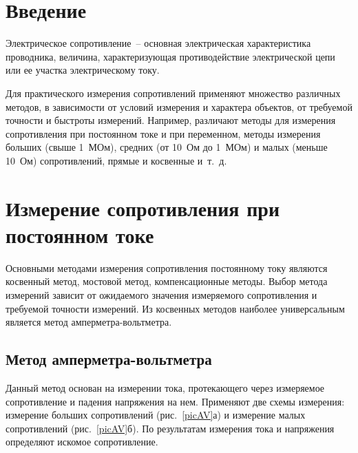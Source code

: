 \documentclass[pscyr]{hedwork}
\newcommand{\Pic}[1]{\ref{pic#1}}
\newcommand{\pic}[1]{рис.~\Pic{#1}}
\begin{document}
  \maketitle
  \tableofcontents

  \section*{Введение}
  
  Электрическое сопротивление~-- основная электрическая характеристика
  проводника, величина, характеризующая противодействие электрической цепи или
  ее участка электрическому току.

  Для практического измерения сопротивлений применяют множество различных
  методов, в зависимости от условий измерения и характера объектов, от требуемой
  точности и быстроты измерений. Например, различают методы для измерения
  сопротивления при постоянном токе и при переменном, методы измерения
  больших (свыше 1~МОм), средних (от 10~Ом до 1~МОм) и малых (меньше 10~Ом)
  сопротивлений, прямые и косвенные и~т.~д.

  \section{Измерение сопротивления при постоянном токе}

  Основными методами измерения сопротивления постоянному току являются косвенный
  метод, мостовой метод, компенсационные методы. Выбор метода измерений зависит
  от ожидаемого значения измеряемого сопротивления и требуемой точности
  измерений. Из косвенных методов наиболее универсальным является метод
  амперметра-вольтметра.

  \subsection{Метод амперметра-вольтметра}

  Данный метод основан на измерении тока, протекающего через измеряемое
  сопротивление и падения напряжения на нем. Применяют две схемы измерения:
  измерение больших сопротивлений (\pic{AV}а) и измерение малых сопротивлений
  (\pic{AV}б). По результатам измерения тока и напряжения определяют искомое
  сопротивление.
  
\end{document}
